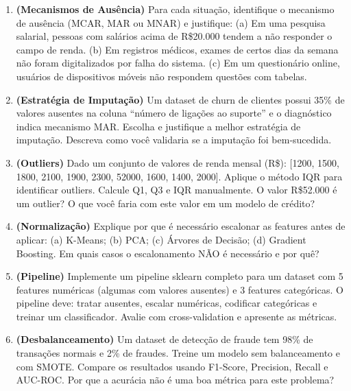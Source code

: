 \documentclass[12pt,a4paper]{article}
\begin{document}
\begin{enumerate}[leftmargin=*, label=\textbf{Exercício \arabic*.}]

  \item \textbf{(Mecanismos de Ausência)} Para cada situação, identifique o mecanismo de ausência (MCAR, MAR ou MNAR) e justifique: (a) Em uma pesquisa salarial, pessoas com salários acima de R\$20.000 tendem a não responder o campo de renda. (b) Em registros médicos, exames de certos dias da semana não foram digitalizados por falha do sistema. (c) Em um questionário online, usuários de dispositivos móveis não respondem questões com tabelas.

  \item \textbf{(Estratégia de Imputação)} Um dataset de churn de clientes possui 35\% de valores ausentes na coluna ``número de ligações ao suporte'' e o diagnóstico indica mecanismo MAR. Escolha e justifique a melhor estratégia de imputação. Descreva como você validaria se a imputação foi bem-sucedida.

  \item \textbf{(Outliers)} Dado um conjunto de valores de renda mensal (R\$): [1200, 1500, 1800, 2100, 1900, 2300, 52000, 1600, 1400, 2000]. Aplique o método IQR para identificar outliers. Calcule Q1, Q3 e IQR manualmente. O valor R\$52.000 é um outlier? O que você faria com este valor em um modelo de crédito?

  \item \textbf{(Normalização)} Explique por que é necessário escalonar as features antes de aplicar: (a) K-Means; (b) PCA; (c) Árvores de Decisão; (d) Gradient Boosting. Em quais casos o escalonamento NÃO é necessário e por quê?

  \item \textbf{(Pipeline)} Implemente um pipeline sklearn completo para um dataset com 5 features numéricas (algumas com valores ausentes) e 3 features categóricas. O pipeline deve: tratar ausentes, escalar numéricas, codificar categóricas e treinar um classificador. Avalie com cross-validation e apresente as métricas.

  \item \textbf{(Desbalanceamento)} Um dataset de detecção de fraude tem 98\% de transações normais e 2\% de fraudes. Treine um modelo sem balanceamento e com SMOTE. Compare os resultados usando F1-Score, Precision, Recall e AUC-ROC. Por que a acurácia não é uma boa métrica para este problema?

\end{enumerate}
\end{document}
